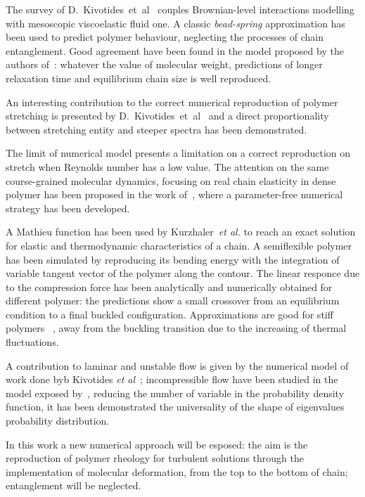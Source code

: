 The survey of D.~Kivotides~et~al~\cite{demos2}  couples Brownian-level interactions modelling with mesoscopic viscoelastic fluid one. 
A classic \textit{bead-spring} approximation has been used to predict polymer behaviour, neglecting the processes of chain entanglement. 
Good agreement have been found in the model proposed by the authors of~\cite{demos2}: whatever the value of molecular weight, predictions of longer relaxation time and equilibrium chain size is well reproduced.

An interesting contribution to the correct numerical reproduction of polymer stretching is presented by D.~Kivotides~et~al~\cite{demos3} and a direct proportionality between stretching entity and steeper spectra has been demonstrated.

The limit of numerical model presents a limitation on a correct reproduction on stretch when Reynolds number has a low value. The attention on the same course-grained molecular dynamics, focusing on real chain elasticity in dense polymer has been proposed in the work of~\cite{demos4}, where a parameter-free numerical strategy has been developed. 


A Mathieu function has been used by Kurzhaler~\emph{et al.}\cite{kurz} to reach an exact solution for elastic and thermodynamic characteristics of a chain. A semiflexible polymer has been simulated by reproducing its bending energy with the integration of variable tangent vector of the polymer along the contour. The linear responce due to the compression force has been analytically and numerically obtained for different polymer: the predictions show a small crossover from an equilibrium condition to a final buckled configuration. Approximations are good for stiff polymers~\cite{frank} , away from the buckling transition due to the increasing of thermal fluctuations.


A contribution to laminar and unstable flow is given by the numerical model of work done byb Kivotides \emph{et al}~\cite{demos5}; incompressible flow have been studied in the model exposed by~\cite{str}, reducing the number of variable in the probability density function, it has been demonstrated the universality of the shape of eigenvalues probability distribution.

In this work a new numerical approach will be esposed: the aim is the reproduction of polymer rheology for turbulent solutions through the implementation of molecular deformation, from the top to the bottom of chain; entanglement will be neglected.






